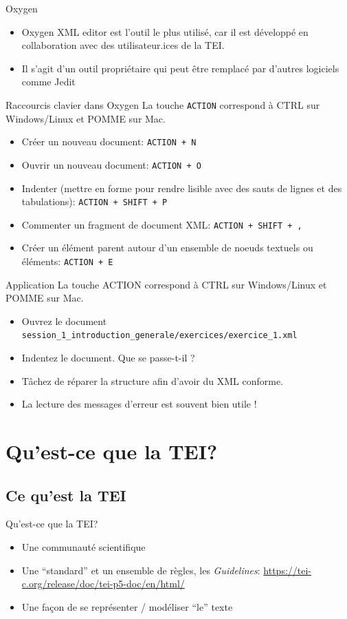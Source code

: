 \documentclass[11pt,aspectratio=1610]{beamer}
\begin{document}
\begin{frame}{Oxygen}
\begin{itemize}
\item Oxygen XML editor est l'outil le plus utilisé, car il est développé en collaboration avec des utilisateur.ices de la TEI.
\item Il s'agit d'un outil propriétaire qui peut être remplacé par d'autres logiciels comme Jedit
\end{itemize}
\end{frame}

\begin{frame}{Raccourcis clavier dans Oxygen}
La touche \texttt{ACTION} correspond à CTRL sur Windows/Linux et POMME sur Mac.
\begin{itemize}
\item Créer un nouveau document: \texttt{ACTION + N}
\item Ouvrir un nouveau document: \texttt{ACTION + O}
\item Indenter (mettre en forme pour rendre lisible avec des sauts de lignes et des tabulations): \texttt{ACTION + SHIFT + P}
\item Commenter un fragment de document XML: \texttt{ACTION + SHIFT + ,}
\item Créer un élément parent autour d'un ensemble de noeuds textuels ou éléments: \texttt{ACTION + E}
\end{itemize}
\end{frame}


\begin{frame}{Application}
La touche ACTION correspond à CTRL sur Windows/Linux et POMME sur Mac.
\begin{itemize}
\item Ouvrez le document \texttt{session\_1\_introduction\_generale/exercices/exercice\_1.xml}
\item Indentez le document. Que se passe-t-il ?
\item Tâchez de réparer la structure afin d'avoir du XML conforme.
\item La lecture des messages d'erreur est souvent bien utile !
\end{itemize}
\end{frame}


\section{Qu'est-ce que la TEI?}

\subsection{Ce qu'est la TEI}
\begin{frame}{Qu'est-ce que la TEI?}
\begin{itemize}
\item Une communauté scientifique
\item Une \enquote{standard} et un ensemble de règles, les \textit{Guidelines}: \url{https://tei-c.org/release/doc/tei-p5-doc/en/html/}
\item Une façon de se représenter / modéliser \enquote{le} texte
\end{itemize}
\end{frame}
\end{document}
